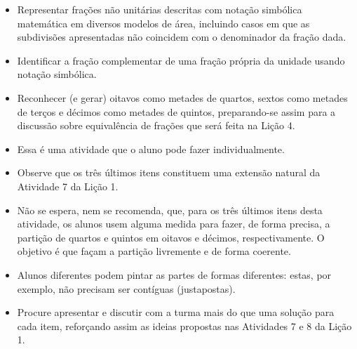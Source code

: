 \begin{multicols}{2}
\begin{objetivos}{}{}
  \begin{itemize} %
    \item       Representar frações não unitárias descritas com notação simbólica matemática em diversos modelos de área, incluindo casos em que as subdivisões apresentadas não coincidem com o denominador da fração dada.
    \item       Identificar a fração complementar de uma fração própria da unidade usando notação simbólica.
    \item       Reconhecer (e gerar) oitavos como metades de quartos, sextos como metades de terços e décimos como metades de quintos, preparando-se assim para a discussão sobre equivalência de frações que será feita na Lição 4.
\end{itemize} %
\end{objetivos}

\begin{orientacoes}
\begin{itemize} %
    \item       Essa é uma atividade que o aluno pode fazer individualmente.
    \item       Observe que os três últimos itens constituem uma extensão natural da Atividade 7 da Lição 1.
    \item       Não se espera, nem se recomenda, que, para os três últimos itens desta atividade, os alunos usem alguma medida para fazer, de forma precisa, a partição de quartos e quintos em oitavos e décimos, respectivamente. O objetivo é que façam a partição livremente e de forma coerente.
    \item       Alunos diferentes podem pintar as partes de formas diferentes: estas, por exemplo, não precisam ser contíguas (justapostas).
    \item       Procure apresentar e discutir com a turma mais do que uma solução para cada item, reforçando assim as ideias propostas nas Atividades 7 e 8 da Lição 1.
\end{itemize} %




\end{orientacoes}
\end{multicols}

